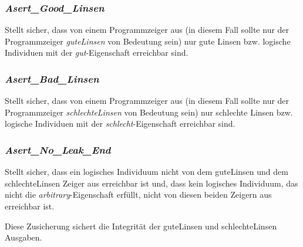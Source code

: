 
\subsubsection{\emph{Asert\_Good\_Linsen}}
Stellt sicher, dass von einem Programmzeiger aus (in diesem Fall sollte nur der Programmzeiger \emph{guteLinsen} von Bedeutung sein) nur gute Linsen bzw. logische Individuen mit der \emph{gut}-Eigenschaft erreichbar sind.


\subsubsection{\emph{Asert\_Bad\_Linsen}}
Stellt sicher, dass von einem Programmzeiger aus (in diesem Fall sollte nur der Programmzeiger \emph{schlechteLinsen} von Bedeutung sein) nur schlechte Linsen bzw. logische Individuen mit der \emph{schlecht}-Eigenschaft erreichbar sind.


\subsubsection{\emph{Asert\_No\_Leak\_End}}
Stellt sicher, dass ein logisches Individuum nicht von dem guteLinsen und dem schlechteLinsen Zeiger aus erreichbar ist und, dass kein logisches Individuum, das nicht die \emph{arbitrary}-Eigenschaft erfüllt, nicht von diesen beiden Zeigern aus erreichbar ist.

Diese Zusicherung sichert die Integrität der guteLinsen und schlechteLinsen Ausgaben.

